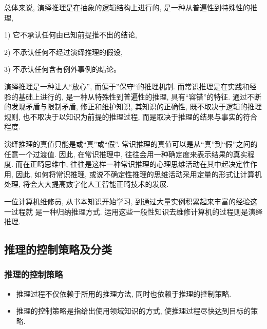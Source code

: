 总体来说, 演绎推理是在抽象的逻辑结构上进行的, 是一种从普遍性到特殊性的推理,

1) 它不承认任何由已知前提推不出的结论,

2) 不承认任何不经过演绎推理的假设,

3) 不承认任何含有例外事例的结论。

演绎推理是一种让人“放心”, 而偏于”保守“的推理机制. 而常识推理是在实践和经验的基础上进行的, 是一种从特殊性到普遍性的推理, 具有“容错”的特征.
通过不断的发现矛盾与限制矛盾, 修正和维护知识, 其知识的正确性, 既不取决于逻辑的推理规则, 也不取决于以知识为前提的推理过程, 而是取决于推理的结果与事实的符合程度.

演绎推理的真值只能是或“真”或“假”.
常识推理的真值可以是从“真”到“假”之间的任意一个过渡值. 因此, 在常识推理中, 往往会用一种确定度来表示结果的真实程度.
而在正畸思维中, 往往是这样一种常识推理的心理思维活动在其中起决定性作用, 因此, 如何将常识推理, 或说不确定性推理的思维活动采用定量的形式让计算机处理, 将会大大提高数字化人工智能正畸技术的发展.
\begin{example}
  一位计算机维修员, 从书本知识开始学习, 到通过大量实例积累起来丰富的经验这一过程就 是一种归纳推理方式. 运用这些一般性知识去维修计算机的过程则是演绎推理.
\end{example}
\subsection{推理的控制策略及分类}
\subsubsection{推理的控制策略}
\begin{itemize}
\item 推理过程不仅依赖于所用的推理方法, 同时也依赖于推理的控制策略.
\item 推理的控制策略是指给出使用领域知识的方式, 使推理过程尽快达到目标的策略.
\end{itemize}
